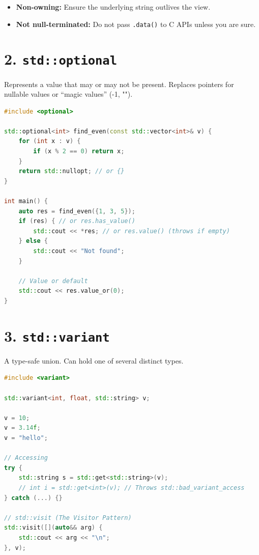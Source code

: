 \begin{itemize}
\tightlist
\item
  \textbf{Non-owning:} Ensure the underlying string outlives the view.
\item
  \textbf{Not null-terminated:} Do not pass
  \passthrough{\lstinline!.data()!} to C APIs unless you are sure.
\end{itemize}

\hypertarget{stdoptional}{%
\section{\texorpdfstring{2.
\texttt{std::optional}}{2. std::optional}}\label{stdoptional}}

Represents a value that may or may not be present. Replaces pointers for
nullable values or ``magic values'' (-1, "").

\begin{lstlisting}[language={C++}]
#include <optional>

std::optional<int> find_even(const std::vector<int>& v) {
    for (int x : v) {
        if (x % 2 == 0) return x;
    }
    return std::nullopt; // or {}
}

int main() {
    auto res = find_even({1, 3, 5});
    if (res) { // or res.has_value()
        std::cout << *res; // or res.value() (throws if empty)
    } else {
        std::cout << "Not found";
    }
    
    // Value or default
    std::cout << res.value_or(0); 
}
\end{lstlisting}

\hypertarget{stdvariant}{%
\section{\texorpdfstring{3.
\texttt{std::variant}}{3. std::variant}}\label{stdvariant}}

A type-safe union. Can hold one of several distinct types.

\begin{lstlisting}[language={C++}]
#include <variant>

std::variant<int, float, std::string> v;

v = 10;
v = 3.14f;
v = "hello";

// Accessing
try {
    std::string s = std::get<std::string>(v);
    // int i = std::get<int>(v); // Throws std::bad_variant_access
} catch (...) {}

// std::visit (The Visitor Pattern)
std::visit([](auto&& arg) {
    std::cout << arg << "\n";
}, v);
\end{lstlisting}

